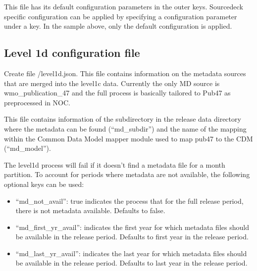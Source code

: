 \documentclass[letterpaper,10pt,english]{sphinxmanual}
\begin{document}
\begin{sphinxVerbatim}[commandchars=\\\{\}]
   
   
   
\end{sphinxVerbatim}

This file has its default configuration parameters in the outer keys.
Source\sphinxhyphen{}deck specific configuration can be applied by specifying a configuration
parameter under a  key. In the sample above, only the default
configuration is applied.


\subsection{Level 1d configuration file}
\label{\detokenize{index:level-1d-configuration-file}}\label{\detokenize{index:level1d-config-file}}
Create file /level1d.json. This file contains information
on the metadata sources that are merged into the level1c data. Currently the
only MD source is wmo\_publication\_47 and the full process is basically tailored
to Pub47 as pre\sphinxhyphen{}processed in NOC.

This file contains information of the subdirectory in the release data directory
where the metadata can be found (“md\_subdir”) and the name of the mapping within the
Common Data Model mapper module used to map pub47 to the CDM (“md\_model”).

The level1d process will fail if it doesn’t find a metadata file for a month
partition. To account for periods where metadata are not available, the
following optional keys can be used:
\begin{itemize}
\item {} 
“md\_not\_avail”: true indicates the process that for the full release period,
there is not metadata available. Defaults to false.

\item {} 
“md\_first\_yr\_avail”: indicates the first year for which metadata files should
be available in the release period. Defaults to first year in the release
period.

\item {} 
“md\_last\_yr\_avail”: indicates the last year for which metadata files should be
available in the release period. Defaults to last year in the release
period.

\end{itemize}
\end{document}
